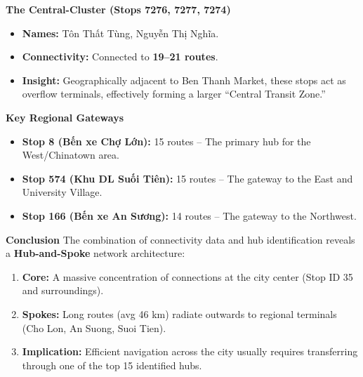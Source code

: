 \textbf{The Central-Cluster (Stops 7276, 7277, 7274)}
\begin{itemize}
    \item \textbf{Names:} Tôn Thất Tùng, Nguyễn Thị Nghĩa.
    \item \textbf{Connectivity:} Connected to \textbf{19--21 routes}.
    \item \textbf{Insight:} Geographically adjacent to Ben Thanh Market, these stops act as overflow terminals, effectively forming a larger ``Central Transit Zone.''
\end{itemize}

\textbf{Key Regional Gateways}
\begin{itemize}
    \item \textbf{Stop 8 (Bến xe Chợ Lớn):} 15 routes -- The primary hub for the West/Chinatown area.
    \item \textbf{Stop 574 (Khu DL Suối Tiên):} 15 routes -- The gateway to the East and University Village.
    \item \textbf{Stop 166 (Bến xe An Sương):} 14 routes -- The gateway to the Northwest.
\end{itemize}

\textbf{Conclusion}
The combination of connectivity data and hub identification reveals a \textbf{Hub-and-Spoke} network architecture:
\begin{enumerate}
    \item \textbf{Core:} A massive concentration of connections at the city center (Stop ID 35 and surroundings).
    \item \textbf{Spokes:} Long routes (avg 46 km) radiate outwards to regional terminals (Cho Lon, An Suong, Suoi Tien).
    \item \textbf{Implication:} Efficient navigation across the city usually requires transferring through one of the top 15 identified hubs.
\end{enumerate}




